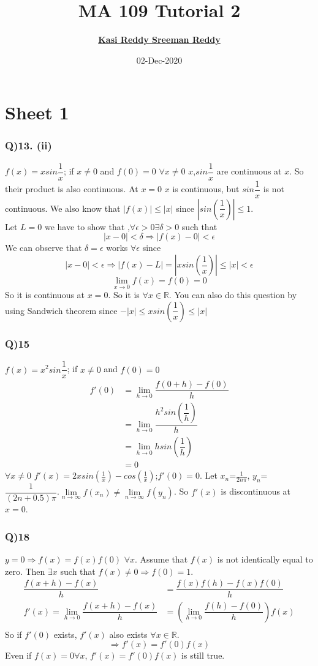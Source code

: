 \documentclass[11pt]{beamer}
\author[K. Sreeman Reddy]{\href{http://iamsreeman.github.io/}{\textbf{Kasi Reddy Sreeman Reddy}}\linebreak\text{2nd year physics student}\linebreak\text{\href{http://iamsreeman.github.io/MA109}{http://iamsreeman.github.io/MA109}}}
\title{MA 109 Tutorial 2}
\institute[]{IIT Bombay}
\date{02-Dec-2020}
\begin{document}
\begin{frame}
\titlepage
\end{frame}


\section{Sheet 1}
\begin{frame}
\frametitle{Q)13. (ii)}
$f(x) = xsin\dfrac{1}{x}$; if $x \neq 0$ and $f(0) = 0$
$\forall x\neq 0$ $x$,$sin\dfrac{1}{x}$ are continuous at $x$. So their product is also continuous. At $x=0$ $x$ is continuous, but $sin\dfrac{1}{x}$ is not continuous.
We also know that $|f(x)|\leq |x| $ since $|sin(\dfrac{1}{x})|\leq 1$.\\
Let $L=0$ we have to show that ,$\forall \epsilon >0 \exists \delta >0$ such that
$$|x-0|<\delta \Rightarrow |f(x)-0|<\epsilon $$
We can observe that $\delta=\epsilon$ works $\forall \epsilon$ since
$$|x-0|<\epsilon \Rightarrow |f(x)-L|=|xsin(\dfrac{1}{x})|\leq |x|<\epsilon $$
$$\underset{x \to 0}{\lim}f(x)=f(0)=0$$
So it is continuous at $x=0$. So it is $\forall x\in \mathbb{R}$. You can also do this question by using Sandwich theorem since $-|x|\leq xsin(\dfrac{1}{x})\leq |x|$
\end{frame}
\begin{frame}
\frametitle{Q)15}
$f(x) = x^2sin\dfrac{1}{x}$; if $x \neq 0$ and $f(0) = 0$
\begin{align*}
f'(0)&=\underset{h \to 0}{\lim}\dfrac{f(0+h)-f(0)}{h}\\
&=\underset{h \to 0}{\lim}\dfrac{h^2sin(\dfrac{1}{h})}{h}\\
&=\underset{h \to 0}{\lim}hsin(\dfrac{1}{h})\\
&=0
\end{align*}
$\forall x\neq 0$ $f'(x)=2xsin(\frac{1}{x})-cos(\frac{1}{x})$;$f'(0)=0$. Let {$x_n$}={$\frac{1}{2n\pi}$}, $y_n$={$\dfrac{1}{(2n+0.5)\pi}$}.$\underset{n \to \infty}{\lim}f(x_n)\neq \underset{n \to \infty}{\lim}f(y_n)$. So $f'(x)$ is discontinuous at $x=0$.
\end{frame}
\begin{frame}
\frametitle{Q)18}
$y=0\Rightarrow f(x)=f(x)f(0)$ $\forall x$. Assume that $f(x)$ is not identically equal to zero. Then $\exists x$ such that $f(x)\neq 0\Rightarrow f(0)=1$.
\begin{align*}
\dfrac{f(x+h)-f(x)}{h}&=\dfrac{f(x)f(h)-f(x)f(0)}{h}\\
f'(x)=\underset{h \to 0}{\lim}\dfrac{f(x+h)-f(x)}{h}&=\left(\underset{h \to 0}{\lim}\dfrac{f(h)-f(0)}{h}\right) f(x)\\
\end{align*}
So if $f'(0)$ exists, $f'(x)$ also exists $\forall x \in \mathbb{R}$.
$$\Rightarrow f'(x)=f'(0)f(x)$$
Even if $f(x)=0 \forall x$, $f'(x)=f'(0)f(x)$ is still true.
\end{frame}
\end{document}
